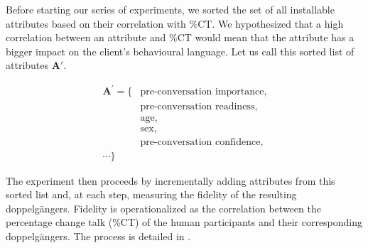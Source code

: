 Before starting our series of experiments, we sorted the set of all installable attributes based on their correlation with \%CT. We hypothesized that a high correlation between an attribute and \%CT would mean that the attribute has a bigger impact on the client's behavioural language. Let us call this sorted list of attributes $\mathbf{A'}$.

$$
\begin{aligned}
{\textbf{A}}^{'} = \{ & \text{pre-conversation importance,} \\
                     & \text{pre-conversation readiness,} \\
                     & \text{age,} \\
                     & \text{sex,} \\
                      & \text{pre-conversation confidence,} \\
                     \cdots \}
\end{aligned}
$$

The experiment then proceeds by incrementally adding attributes from this sorted list and, at each step, measuring the fidelity of the resulting doppelgängers. Fidelity is operationalized as the correlation between the percentage change talk (\%CT) of the human participants and their corresponding doppelgängers. The process is detailed in .

